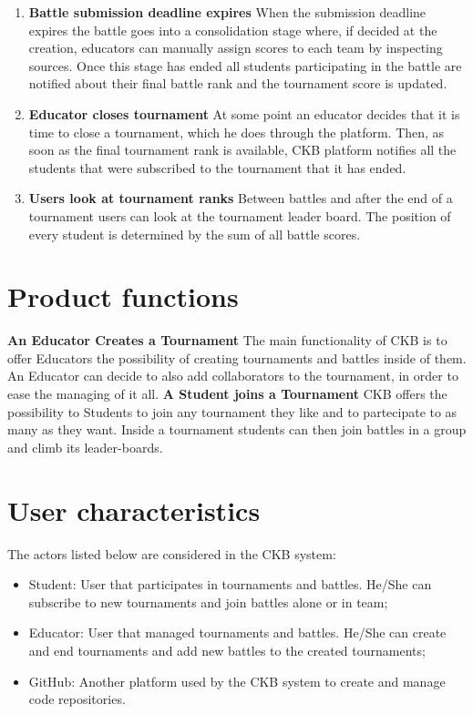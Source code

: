 \begin{enumerate}
    \item \textbf{Battle submission deadline expires}\newline
    When the submission deadline expires the battle goes into a consolidation stage where, if decided at the creation, educators can manually assign scores to each team by inspecting sources. Once this stage has ended all students participating in the battle are notified about their final battle rank and the tournament score is updated.
    
    \item \textbf{Educator closes tournament}\newline
    At some point an educator decides that it is time to close a tournament, which he does through the platform. Then, as soon as the final tournament rank is available, \ac{CKB} platform notifies all the students that were subscribed to the tournament that it has ended.
 
    
    \item \textbf{Users look at tournament ranks}\newline
    Between battles and after the end of a tournament users can look at the tournament leader board. The position of every student is determined by the sum of all battle scores.
    
\end{enumerate}

\newpage
\section{Product functions}
\textbf{An Educator Creates a Tournament}\newline
The main functionality of \ac{CKB} is to offer Educators the possibility of creating tournaments and battles inside of them. An Educator can decide to also add collaborators to the tournament, in order to ease the managing of it all.
\textbf{A Student joins a Tournament}\newline
\ac{CKB} offers the possibility to Students to join any tournament they like and to partecipate to as many as they want. Inside a tournament students can then join battles in a group and climb its leader-boards.

\section{User characteristics}
The actors listed below are considered in the \ac{CKB} system:\newline
\begin{itemize}
    \item Student: User that participates in tournaments and battles. He/She can subscribe to new tournaments and join battles alone or in team;
    \item Educator: User that managed tournaments and battles. He/She can create and end tournaments and add new battles to the created tournaments;
    \item GitHub: Another platform used by the \ac{CKB} system to create and manage code repositories.
\end{itemize}

